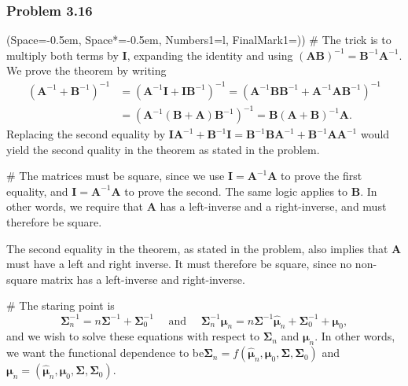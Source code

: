 \documentclass[12pt, a4paper]{article}
\newcommand{\listSpace}{-0.5em}%
\newcommand{\vect}[1]{\bm{#1}}
\begin{document}
\subsubsection*{Problem 3.16}
\begin{easylist}[enumerate]
	\ListProperties(Space=\listSpace, Space*=\listSpace, Numbers1=l, FinalMark1={)})
	# The trick is to multiply both terms by $\vect{I}$, expanding the identity and using $\left(\vect{A} \vect{B}\right)^{-1} = \vect{B}^{-1} \vect{A}^{-1}$. 
	We prove the theorem by writing
	\begin{align*}
	\left( \vect{A}^{-1} + \vect{B}^{-1}\right)^{-1} &=
		\left( \vect{A}^{-1} \vect{I} + \vect{I}\vect{B}^{-1}\right)^{-1} =
		\left( \vect{A}^{-1} \vect{B} \vect{B}^{-1} + \vect{A}^{-1} \vect{A}\vect{B}^{-1}\right)^{-1} \\
		&=  \left( \vect{A}^{-1} \left( \vect{B} + \vect{A} \right) \vect{B}^{-1} \right)^{-1} = 
		 \vect{B}\left( \vect{A} + \vect{B} \right)^{-1} \vect{A}.
	\end{align*}
	Replacing the second equality by $\vect{I} \vect{A}^{-1}  + \vect{B}^{-1} \vect{I} = \vect{B}^{-1} \vect{B}  \vect{A}^{-1} + \vect{B}^{-1} \vect{A} \vect{A}^{-1}$ would yield the second quality in the theorem as stated in the problem.
	
	# The matrices must be square, since we use $\vect{I} = \vect{A}^{-1} \vect{A}$ to prove the first equality, and $\vect{I} = \vect{A}^{-1} \vect{A}$ to prove the second. The same logic applies to $\vect{B}$.
	In other words, we require that $\vect{A}$ has a left-inverse and a right-inverse, and must therefore be square.
	
	The second equality in the theorem, as stated in the problem, also implies that $\vect{A}$ must have a left and right inverse.
	It must therefore be square, since no non-square matrix has a left-inverse and right-inverse.
	
	# The staring point is
	\begin{equation*}
		\vect{\Sigma}_n^{-1} = n \vect{\Sigma}^{-1} + \vect{\Sigma}_0^{-1}
		\quad \text{ and } \quad
		\vect{\Sigma}_n^{-1} \vect{\mu}_n 
		=n \vect{\Sigma}^{-1} \hat{\vect{\mu}}_n 
		+
		\vect{\Sigma}^{-1}_0 + \vect{\mu}_0,
	\end{equation*}
	and we wish to solve these equations with respect to $\vect{\Sigma}_n$ and $\vect{\mu}_n$. 
	In other words, we want the functional dependence to be$\vect{\Sigma}_n = f \left( \hat{\vect{\mu}}_n, \vect{\mu}_0, \vect{\Sigma}, \vect{\Sigma}_0 \right)$
	and $\vect{\mu}_n = \left( \hat{\vect{\mu}}_n, \vect{\mu}_0, \vect{\Sigma}, \vect{\Sigma}_0 \right)$.
	

\end{easylist}
\end{document}
